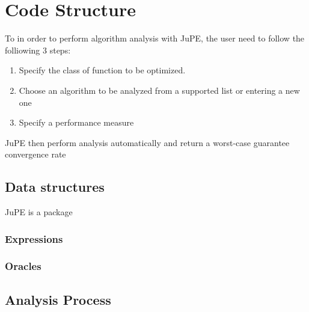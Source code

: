 \chapter{Code Structure}

To in order to perform algorithm analysis with JuPE, the user need to follow the folliowing 3 steps:
\begin{enumerate}
	\item Specify the class of function to be optimized.
	\item Choose an algorithm to be analyzed from a supported list or entering a new one 
	\item Specify a performance measure
  \end{enumerate}
JuPE then perform analysis automatically and return a worst-case guarantee convergence rate
\section{Data structures}
JuPE is a package 
\subsection*{Expressions}
\subsection*{Oracles}
\section{Analysis Process}
